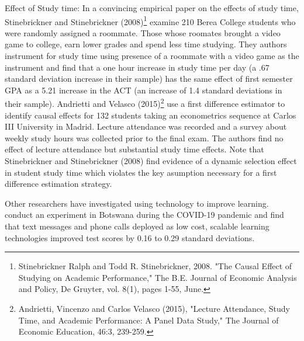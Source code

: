 \documentclass[12pt]{article}
\begin{document}
Effect of Study time: In a convincing empirical paper on the effects of study time, Stinebrickner and Stinebrickner (2008)\footnote{Stinebrickner Ralph and  Todd R. Stinebrickner, 2008. "The Causal Effect of Studying on Academic Performance," The B.E. Journal of Economic Analysis and Policy, De Gruyter, vol. 8(1), pages 1-55, June.} examine 210 Berea College students who were randomly assigned a roommate. Those whose roomates brought a video game to college, earn lower grades and spend less time studying.  They authors instrument for study time using presence of a roommate with a video game as the instrument and find that a one hour increase in study time per day (a .67 standard deviation increase in their sample) has the same effect of first semester GPA as a 5.21 increase in the ACT (an increase of 1.4 standard deviations in their sample).  Andrietti and Velasco (2015)\footnote{Andrietti, Vincenzo and Carlos Velasco (2015), "Lecture Attendance, Study Time, and Academic Performance: A Panel Data Study," The Journal of Economic Education, 46:3, 239-259.} use a first difference estimator to identify causal effects for 132 students taking an econometrics sequence at Carlos III University in Madrid. Lecture attendance was recorded and a survey about weekly study hours was collected prior to the final exam.  The authors find no effect of lecture attendance but substantial study time effects. Note that Stinebrickner and Stinebrickner (2008) find evidence of a dynamic selection effect in student study time which violates the key asumption necessary for a first difference estimation strategy.  

Other researchers have investigated using technology to improve learning. \textcite{nbbm2020} conduct an experiment in Botswana during the COVID-19 pandemic and find that text messages and phone calls deployed as low cost, scalable learning technologies improved test scores by 0.16 to 0.29 standard deviations. 
\end{document}

